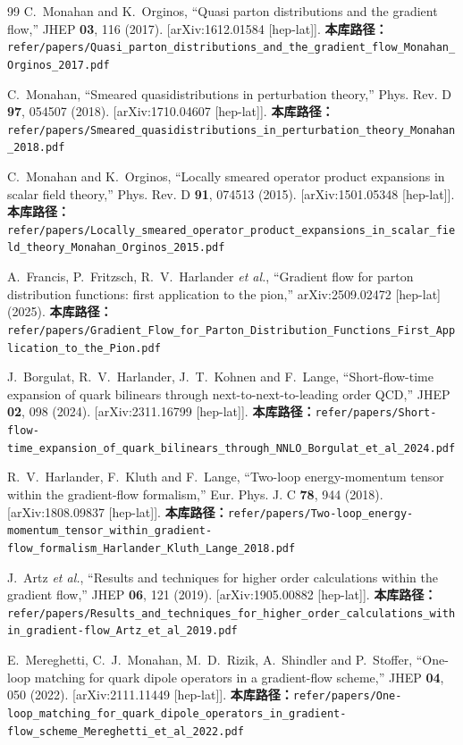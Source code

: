 \documentclass[12pt,a4paper]{ctexart}
\theoremstyle{definition}
\begin{document}
\begin{thebibliography}{99}
C.~Monahan and K.~Orginos,
``Quasi parton distributions and the gradient flow,''
JHEP \textbf{03}, 116 (2017).
[arXiv:1612.01584 [hep-lat]].
\textbf{本库路径：}\texttt{refer/papers/Quasi\_parton\_distributions\_and\_the\_gradient\_flow\_Monahan\_Orginos\_2017.pdf}

C.~Monahan,
``Smeared quasidistributions in perturbation theory,''
Phys. Rev. D \textbf{97}, 054507 (2018).
[arXiv:1710.04607 [hep-lat]].
\textbf{本库路径：}\texttt{refer/papers/Smeared\_quasidistributions\_in\_perturbation\_theory\_Monahan\_2018.pdf}

C.~Monahan and K.~Orginos,
``Locally smeared operator product expansions in scalar field theory,''
Phys. Rev. D \textbf{91}, 074513 (2015).
[arXiv:1501.05348 [hep-lat]].
\textbf{本库路径：}\texttt{refer/papers/Locally\_smeared\_operator\_product\_expansions\_in\_scalar\_field\_theory\_Monahan\_Orginos\_2015.pdf}

A.~Francis, P.~Fritzsch, R.~V.~Harlander \textit{et al.},
``Gradient flow for parton distribution functions: first application to the pion,''
arXiv:2509.02472 [hep-lat] (2025).
\textbf{本库路径：}\texttt{refer/papers/Gradient\_Flow\_for\_Parton\_Distribution\_Functions\_First\_Application\_to\_the\_Pion.pdf}

J.~Borgulat, R.~V.~Harlander, J.~T.~Kohnen and F.~Lange,
``Short-flow-time expansion of quark bilinears through next-to-next-to-leading order QCD,''
JHEP \textbf{02}, 098 (2024).
[arXiv:2311.16799 [hep-lat]].
\textbf{本库路径：}\texttt{refer/papers/Short-flow-time\_expansion\_of\_quark\_bilinears\_through\_NNLO\_Borgulat\_et\_al\_2024.pdf}

R.~V.~Harlander, F.~Kluth and F.~Lange,
``Two-loop energy-momentum tensor within the gradient-flow formalism,''
Eur. Phys. J. C \textbf{78}, 944 (2018).
[arXiv:1808.09837 [hep-lat]].
\textbf{本库路径：}\texttt{refer/papers/Two-loop\_energy-momentum\_tensor\_within\_gradient-flow\_formalism\_Harlander\_Kluth\_Lange\_2018.pdf}

J.~Artz \textit{et al.},
``Results and techniques for higher order calculations within the gradient flow,''
JHEP \textbf{06}, 121 (2019).
[arXiv:1905.00882 [hep-lat]].
\textbf{本库路径：}\texttt{refer/papers/Results\_and\_techniques\_for\_higher\_order\_calculations\_within\_gradient-flow\_Artz\_et\_al\_2019.pdf}

E.~Mereghetti, C.~J.~Monahan, M.~D.~Rizik, A.~Shindler and P.~Stoffer,
``One-loop matching for quark dipole operators in a gradient-flow scheme,''
JHEP \textbf{04}, 050 (2022).
[arXiv:2111.11449 [hep-lat]].
\textbf{本库路径：}\texttt{refer/papers/One-loop\_matching\_for\_quark\_dipole\_operators\_in\_gradient-flow\_scheme\_Mereghetti\_et\_al\_2022.pdf}


\end{thebibliography}
\end{document}
